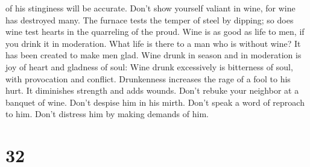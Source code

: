 of his stinginess will be accurate.  Don't show yourself
valiant in wine, for wine has destroyed many.  The furnace
tests the temper of steel by dipping; so does wine test hearts in the
quarreling of the proud.  Wine is as good as life to men,
if you drink it in moderation. What life is there to a man who is
without wine? It has been created to make men glad.  Wine
drunk in season and in moderation is joy of heart and gladness of soul:
 Wine drunk excessively is bitterness of soul, with
provocation and conflict.  Drunkenness increases the rage
of a fool to his hurt. It diminishes strength and adds wounds.
 Don't rebuke your neighbor at a banquet of wine. Don't
despise him in his mirth. Don't speak a word of reproach to him. Don't
distress him by making demands of him.

\hypertarget{section-10}{%
\section{32}\label{section-10}}

